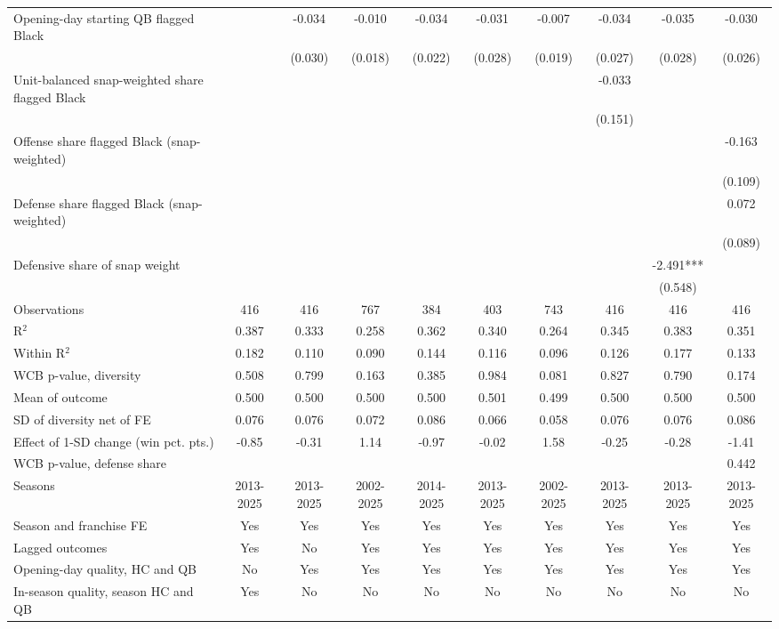 \begin{table}[!h]
{\begin{threeparttable}
\begin{tabular}[t]{lccccccccc}
Opening-day starting QB flagged Black &  & -0.034 & -0.010 & -0.034 & -0.031 & -0.007 & -0.034 & -0.035 & -0.030\\
 &  & (0.030) & (0.018) & (0.022) & (0.028) & (0.019) & (0.027) & (0.028) & (0.026)\\
Unit-balanced snap-weighted share flagged Black &  &  &  &  &  &  & -0.033 &  & \\
 &  &  &  &  &  &  & (0.151) &  & \\
Offense share flagged Black (snap-weighted) &  &  &  &  &  &  &  &  & -0.163\\
 &  &  &  &  &  &  &  &  & (0.109)\\
Defense share flagged Black (snap-weighted) &  &  &  &  &  &  &  &  & 0.072\\
 &  &  &  &  &  &  &  &  & (0.089)\\
Defensive share of snap weight &  &  &  &  &  &  &  & -2.491*** & \\
 &  &  &  &  &  &  &  & (0.548) & \\
\midrule
Observations & 416 & 416 & 767 & 384 & 403 & 743 & 416 & 416 & 416\\
R$^2$ & 0.387 & 0.333 & 0.258 & 0.362 & 0.340 & 0.264 & 0.345 & 0.383 & 0.351\\
Within R$^2$ & 0.182 & 0.110 & 0.090 & 0.144 & 0.116 & 0.096 & 0.126 & 0.177 & 0.133\\
WCB p-value, diversity & 0.508 & 0.799 & 0.163 & 0.385 & 0.984 & 0.081 & 0.827 & 0.790 & 0.174\\
Mean of outcome & 0.500 & 0.500 & 0.500 & 0.500 & 0.501 & 0.499 & 0.500 & 0.500 & 0.500\\
SD of diversity net of FE & 0.076 & 0.076 & 0.072 & 0.086 & 0.066 & 0.058 & 0.076 & 0.076 & 0.086\\
Effect of 1-SD change (win pct. pts.) & -0.85 & -0.31 & 1.14 & -0.97 & -0.02 & 1.58 & -0.25 & -0.28 & -1.41\\
WCB p-value, defense share &  &  &  &  &  &  &  &  & 0.442\\
Seasons & 2013-2025 & 2013-2025 & 2002-2025 & 2014-2025 & 2013-2025 & 2002-2025 & 2013-2025 & 2013-2025 & 2013-2025\\
Season and franchise FE & Yes & Yes & Yes & Yes & Yes & Yes & Yes & Yes & Yes\\
Lagged outcomes & Yes & No & Yes & Yes & Yes & Yes & Yes & Yes & Yes\\
Opening-day quality, HC and QB & No & Yes & Yes & Yes & Yes & Yes & Yes & Yes & Yes\\
In-season quality, season HC and QB & Yes & No & No & No & No & No & No & No & No\\

\end{tabular}
\end{threeparttable}}
\end{table}
